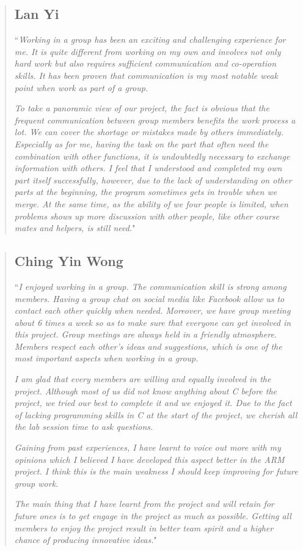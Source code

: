 \documentclass[9pt]{article}
\begin{document}
\begin{quote}
\subsection*{Lan Yi}
``\textit{Working in a group has been an exciting and challenging experience for me. It is quite different from working on my own and involves not only hard work but also requires sufficient communication and co-operation skills. It has been proven that communication is my most notable weak point when work as part of a group.}

\textit{To take a panoramic view of our project, the fact is obvious that the frequent communication between group members benefits the work process a lot. We can cover the shortage or mistakes made by others immediately. Especially as for me, having the task on the part that often need the combination with other functions, it is undoubtedly necessary to exchange information with others. I feel that I understood and completed my own part itself successfully, however, due to the lack of understanding on other parts at the beginning, the program sometimes gets in trouble when we merge. At the same time, as the ability of we four people is limited, when problems shows up more discussion with other people, like other course mates and helpers, is still need.}"
\end{quote}

\begin{quote}
\subsection*{Ching Yin Wong}
``\textit{I enjoyed working in a group. The communication skill is strong among members. Having a group chat on social media like Facebook allow us to contact each other quickly when needed. Moreover, we have group meeting about 6 times a week so as to make sure that everyone can get involved in this project. Group meetings are always held in a friendly atmosphere. Members respect each other’s ideas and suggestions, which is one of the most important aspects when working in a group.}

\textit{I am glad that every members are willing and equally involved in the project. Although most of us did not know anything about C before the project, we tried our best to complete it and we enjoyed it. Due to the fact of lacking programming skills in C at the start of the project, we cherish all the lab session time to ask questions. }

\textit{Gaining from past experiences, I have learnt to voice out more with my opinions which I believed I have developed this aspect better in the ARM project. I think this is the main weakness I should keep improving for future group work.}

\textit{The main thing that I have learnt from the project and will retain for future ones is to get engage in the project as much as possible. Getting all members to enjoy the project result in better team spirit and a higher chance of producing innovative ideas.}"
\end{quote}
\end{document}
